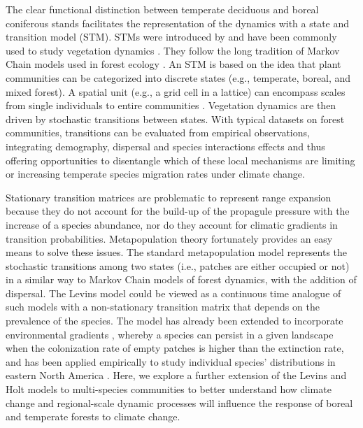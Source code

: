 The clear functional distinction between temperate deciduous and boreal coniferous stands
facilitates the representation of the dynamics with a state and transition model (STM). STMs were
introduced by \citet{Westoby1989} and have been commonly used to study vegetation dynamics
\citep{Briske2005, Bestelmeyer2011}. They follow the long tradition of Markov Chain models used in
forest ecology \citep{waggoner1970, horn1975, binkley1980}. An STM is based on the idea that plant
communities can be categorized into discrete states (e.g., temperate, boreal, and mixed forest). A
spatial unit (e.g., a grid cell in a lattice) can encompass scales from single individuals to entire
communities \citep{Briske2005}. Vegetation dynamics are then driven by stochastic transitions
between states. With typical datasets on forest communities, transitions can be evaluated from
empirical observations, integrating demography, dispersal and species interactions effects and thus
offering opportunities to disentangle which of these local mechanisms are limiting or increasing
temperate species migration rates under climate change.

Stationary transition matrices are problematic to represent range expansion because they do not
account for the build-up of the propagule pressure with the increase of a species abundance, nor do
they account for climatic gradients in transition probabilities. Metapopulation theory fortunately
provides an easy means to solve these issues. The standard metapopulation model \citep{Levins1969}
represents the stochastic transitions among two states (i.e., patches are either occupied or not) in
a similar way to Markov Chain models of forest dynamics, with the addition of dispersal. The Levins
model \citep{Levins1969} could be viewed as a continuous time analogue of such models with a
non-stationary transition matrix that depends on the prevalence of the species. The model has
already been extended  to incorporate environmental gradients \citep{Holt2000,Holt2005}, whereby a
species can persist in a given landscape when the colonization rate of empty patches is higher than
the extinction rate, and has been applied empirically to study individual species' distributions in
eastern North America \citep{Talluto2state}. Here, we explore a further extension of the Levins and
Holt models to multi-species communities to better understand how climate change and regional-scale
dynamic processes  will influence the response of boreal and temperate forests to climate change.


